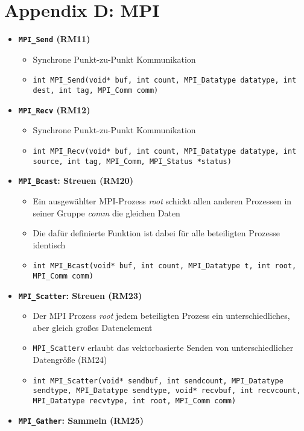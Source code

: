 \section{Appendix D: MPI}
\begin{itemize}
	\item \textbf{\texttt{MPI\_Send} (RM11)}
	\begin{itemize}
		\item Synchrone Punkt-zu-Punkt Kommunikation
		\item \texttt{int MPI\_Send(void* buf, int count, MPI\_Datatype datatype, int dest, int tag, MPI\_Comm comm)}
	\end{itemize}
	\item \textbf{\texttt{MPI\_Recv} (RM12)}
	\begin{itemize}
		\item Synchrone Punkt-zu-Punkt Kommunikation
		\item \texttt{int MPI\_Recv(void* buf, int count, MPI\_Datatype datatype, int source, int tag, MPI\_Comm, MPI\_Status *status)}
	\end{itemize}
	\item \textbf{\texttt{MPI\_Bcast}: Streuen (RM20)}
	\begin{itemize}
		\item Ein ausgewählter MPI-Prozess \textit{root} schickt allen anderen Prozessen in seiner Gruppe \textit{comm} die gleichen Daten
		\item Die dafür definierte Funktion ist dabei für alle beteiligten Prozesse identisch
		\item \texttt{int MPI\_Bcast(void* buf, int count, MPI\_Datatype t, int root, MPI\_Comm comm)}
	\end{itemize}
	\item \textbf{\texttt{MPI\_Scatter}: Streuen (RM23)}
	\begin{itemize}
		\item Der MPI Prozess \textit{root} jedem beteiligten Prozess ein unterschiedliches, aber gleich großes Datenelement
		\item \texttt{MPI\_Scatterv} erlaubt das vektorbasierte Senden von unterschiedlicher Datengröße (RM24)
		\item \texttt{int MPI\_Scatter(void* sendbuf, int sendcount, MPI\_Datatype sendtype, MPI\_Datatype sendtype, void* recvbuf, int recvcount, MPI\_Datatype recvtype, int root, MPI\_Comm comm)}
	\end{itemize}
	\item \textbf{\texttt{MPI\_Gather}: Sammeln (RM25)}

\end{itemize}
